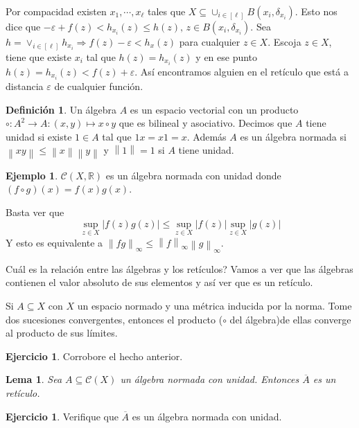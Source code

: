 \documentclass[12pt]{article}
\theoremstyle{plain}
\newtheorem{Lem}[Th]{Lema}             %
\theoremstyle{definition}
\newtheorem{Def}[Th]{Definición}       %
\newtheorem{Ex}[Th]{Ejemplo}               %
\newtheorem{Ej}[Th]{Ejercicio}
\theoremstyle{remark}
\numberwithin{equation}{section}
\newcommand{\bR}{\mathbb{R}}        %
\newcommand{\cC}{\mathcal{C}}       %
\renewcommand{\leq}{\leqslant}      %
\renewcommand{\:}{\colon}           %
\newcommand{\bonj}[1]{\left\lbrack#1\right\rbrack}
\newcommand{\nm}[1]{\left\|#1\right\|} %
\begin{document}
\begin{multicols}{2}
\begin{ptcbp}
Por compacidad existen $x_1,\cdots, x_\ell$ tales que
$X\subseteq\cup_{i\in\bonj{\ell}}B(x_i,\delta_{x_i})$.
 Esto nos dice que $-\varepsilon+f(z)<h_{x_i}(z)\leq h(z),\, z\in B(x_i,\delta_{x_i})$.
 Sea $h=\lor_{i\in\bonj{\ell}}h_{x_i}\Rightarrow f(z)-\varepsilon<h_x(z)$
 para cualquier $z\in X$. Escoja $z\in X$, tiene que existe $x_i$ tal que $h(z)=h_{x_i}(z)$ y en ese punto $h(z)=h_{x_i}(z)<f(z)+\varepsilon$. Así encontramos alguien en el retículo que está a distancia $\varepsilon$ de cualquier función.
\end{ptcbp}

\begin{Def}
  Un álgebra $A$ es un espacio vectorial con un producto $\circ\colon A^2\to A\colon (x,y)\mapsto x\circ y$ que es bilineal y asociativo. Decimos que $A$ tiene unidad si existe $\mathit{1}\in A$ tal que $\mathit{1}x=x\mathit{1}=x$. Además $A$ es un álgebra normada si $\nm{xy}\leq\nm{x}\nm{y}$ y $\nm{\mathit{1}}=1$ si $A$ tiene unidad.
\end{Def}

\begin{Ex}
  $\cC(X,\bR)$ es un álgebra normada con unidad donde $(f\circ g)(x)=f(x)g(x)$.
\end{Ex}

\begin{ptcb}
Basta ver que
$$\sup_{z\in X}|f(z)g(z)|\leq \sup_{z\in X}|f(z)|\sup_{z\in X}|g(z)|$$
Y esto es equivalente a $\nm{fg}_\infty\leq \nm{f}_\infty\nm{g}_\infty$.
\end{ptcb}

Cuál es la relación entre las álgebras y los retículos? Vamos a ver que las álgebras contienen el valor absoluto de sus elementos y así ver que es un retículo.\par
Si $A\subseteq X$ con $X$ un espacio normado y una métrica inducida por la norma. Tome dos sucesiones convergentes, entonces el producto ($\circ$ del álgebra)de ellas converge al producto de sus límites.

\begin{Ej}
  Corrobore el hecho anterior.
\end{Ej}

\begin{Lem}\label{lem:algNormadaEsReticulo}
  Sea $A\subseteq\cC(X)$ un álgebra normada con unidad. Entonces $\overline{A}$ es un retículo.
\end{Lem}

\begin{Ej}
 Verifique que $\overline{A}$ es un álgebra normada con unidad.
\end{Ej}


\end{multicols}
\end{document}
